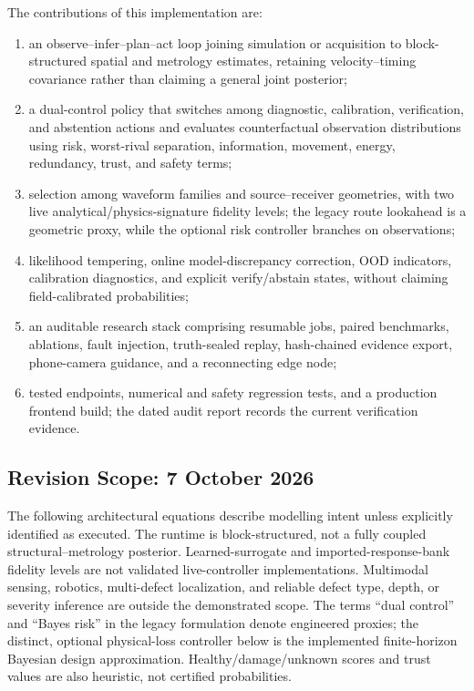 \documentclass[conference]{IEEEtran}
\begin{document}
The contributions of this implementation are:
\begin{enumerate}
    \item an observe--infer--plan--act loop joining simulation or acquisition to block-structured spatial and metrology estimates, retaining velocity--timing covariance rather than claiming a general joint posterior;
    \item a dual-control policy that switches among diagnostic, calibration, verification, and abstention actions and evaluates counterfactual observation distributions using risk, worst-rival separation, information, movement, energy, redundancy, trust, and safety terms;
    \item selection among waveform families and source--receiver geometries, with two live analytical/physics-signature fidelity levels; the legacy route lookahead is a geometric proxy, while the optional risk controller branches on observations;
    \item likelihood tempering, online model-discrepancy correction, OOD indicators, calibration diagnostics, and explicit verify/abstain states, without claiming field-calibrated probabilities;
    \item an auditable research stack comprising resumable jobs, paired benchmarks, ablations, fault injection, truth-sealed replay, hash-chained evidence export, phone-camera guidance, and a reconnecting edge node;
    \item tested endpoints, numerical and safety regression tests, and a production frontend build; the dated audit report records the current verification evidence.
\end{enumerate}

\subsection{Revision Scope: 7 October 2026}
The following architectural equations describe modelling intent unless explicitly identified as executed. The runtime is block-structured, not a fully coupled structural--metrology posterior. Learned-surrogate and imported-response-bank fidelity levels are not validated live-controller implementations. Multimodal sensing, robotics, multi-defect localization, and reliable defect type, depth, or severity inference are outside the demonstrated scope. The terms ``dual control'' and ``Bayes risk'' in the legacy formulation denote engineered proxies; the distinct, optional physical-loss controller below is the implemented finite-horizon Bayesian design approximation. Healthy/damage/unknown scores and trust values are also heuristic, not certified probabilities.
\end{document}
